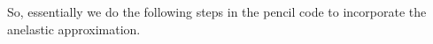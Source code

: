\documentclass[mathleft]{article}
\begin{document}
%
So, essentially we do the following steps in the pencil code to incorporate the anelastic approximation.
\end{document}
